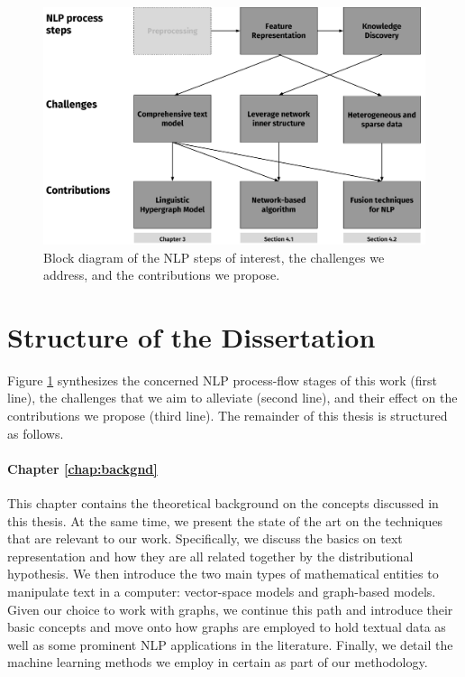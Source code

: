 \begin{figure}
\centering
\includegraphics[width=1\linewidth]{./images/Chapitre1/challenges_contribs.pdf}
\caption{Block diagram of the NLP steps of interest, the challenges we address, and the contributions we propose.}
\label{fig:challenges_contribs}
\end{figure}
\section{Structure of the Dissertation}

Figure \ref{fig:challenges_contribs} synthesizes the concerned NLP process-flow stages of this work (first line), the challenges that we aim to alleviate (second line), and their effect on the contributions we propose (third line). The remainder of this thesis is structured as follows. 

\paragraph{Chapter \ref{chap:backgnd}} This chapter contains the theoretical background on the concepts discussed in this thesis. At the same time, we present the state of the art on the techniques that are relevant to our work. Specifically, we discuss the basics on text representation and how they are all related together by the distributional hypothesis. We then introduce the two main types of mathematical entities to manipulate text in a computer: vector-space models and graph-based models. Given our choice to work with graphs, we continue this path and introduce their basic concepts and move onto how graphs are employed to hold textual data as well as some prominent NLP applications in the literature. 
Finally, we detail the machine learning methods we employ in certain as part of our methodology. 

